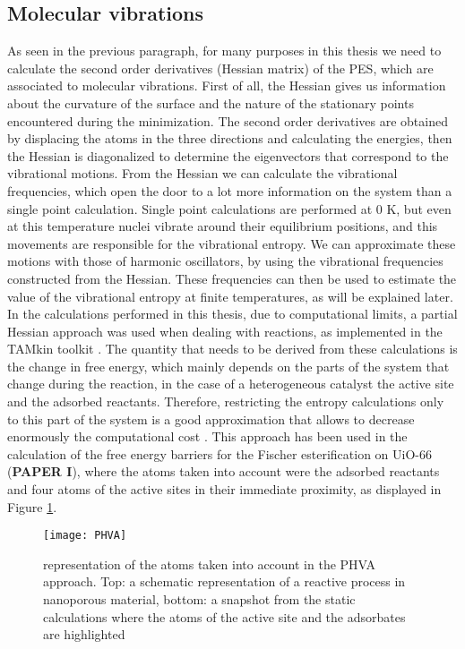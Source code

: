 \subsection{Molecular vibrations}
As seen in the previous paragraph, for many purposes in this thesis we need to calculate the second order derivatives (Hessian matrix) of the PES, which are associated to molecular vibrations. First of all, the Hessian gives us information about the curvature of the surface and the nature of the stationary points encountered during the minimization. The second order derivatives are obtained by displacing the atoms in the three directions and calculating the energies, then the Hessian is diagonalized to determine the eigenvectors that correspond to the vibrational motions. 
From the Hessian we can calculate the vibrational frequencies, which open the door to a lot more information on the system than a single point calculation. Single point calculations are performed at 0 K, but even at this temperature nuclei vibrate around their equilibrium positions, and this movements are responsible for the vibrational entropy. We can approximate these motions with those of harmonic oscillators, by using the vibrational frequencies constructed from the Hessian. These frequencies can then be used to estimate the value of the vibrational entropy at finite temperatures, as will be explained later. In the calculations performed in this thesis, due to computational limits, a partial Hessian approach was used when dealing with reactions, as implemented in the TAMkin toolkit \cite{Ghysels2010}. The quantity that needs to be derived from these calculations is the change in free energy, which mainly depends on the parts of the system that change during the reaction, in the case of a heterogeneous catalyst the active site and the adsorbed reactants. Therefore, restricting the entropy calculations only to this part of the system is a good approximation that allows to decrease enormously the computational cost \cite{Ghysels2007}. This approach has been used in the calculation of the free energy barriers for the Fischer esterification on UiO-66 (\textbf{PAPER I}), where the atoms taken into account were the adsorbed reactants and four atoms of the active sites in their immediate proximity, as displayed in Figure \ref{fig:PHVA}.

\begin{figure}[!htbp]
	\centering
 	\texttt{[image: PHVA]}
	\caption{representation of the atoms taken into account in the PHVA approach. Top: a schematic representation of a reactive process in nanoporous material, bottom: a snapshot from the static calculations where the atoms of the active site and the adsorbates are highlighted}
 \label{fig:PHVA}
\end{figure}


